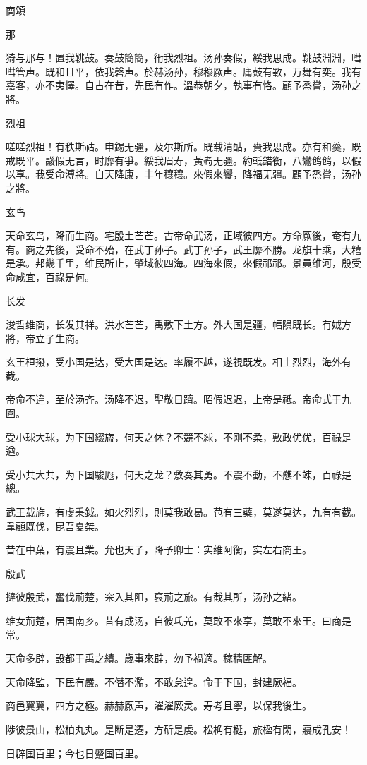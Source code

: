 商頌


那

猗与那与！置我鞉鼓。奏鼓簡簡，衎我烈祖。汤孙奏假，綏我思成。鞉鼓淵淵，嘒嘒管声。既和且平，依我磬声。於赫汤孙，穆穆厥声。庸鼓有斁，万舞有奕。我有嘉客，亦不夷懌。自古在昔，先民有作。溫恭朝夕，執事有恪。顧予烝嘗，汤孙之將。

烈祖

嗟嗟烈祖！有秩斯祜。申錫无疆，及尔斯所。既载清酤，賚我思成。亦有和羹，既戒既平。鬷假无言，时靡有爭。綏我眉寿，黃耇无疆。約軧錯衡，八鸞鸧鸧，以假以享。我受命溥將。自天降康，丰年穰穰。來假來饗，降福无疆。顧予烝嘗，汤孙之將。

玄鸟

天命玄鸟，降而生商。宅殷土芒芒。古帝命武汤，正域彼四方。方命厥後，奄有九有。商之先後，受命不殆，在武丁孙子。武丁孙子，武王靡不勝。龙旗十乘，大糦是承。邦畿千里，维民所止，肇域彼四海。四海來假，來假祁祁。景員维河，殷受命咸宜，百祿是何。

长发

浚哲维商，长发其祥。洪水芒芒，禹敷下土方。外大国是疆，幅隕既长。有娀方將，帝立子生商。

玄王桓撥，受小国是达，受大国是达。率履不越，遂視既发。相土烈烈，海外有截。

帝命不違，至於汤齐。汤降不迟，聖敬日躋。昭假迟迟，上帝是祗。帝命式于九圍。

受小球大球，为下国綴旒，何天之休？不競不絿，不刚不柔，敷政优优，百祿是遒。

受小共大共，为下国駿厖，何天之龙？敷奏其勇。不震不動，不戁不竦，百祿是總。

武王载旆，有虔秉鉞。如火烈烈，則莫我敢曷。苞有三蘗，莫遂莫达，九有有截。韋顧既伐，昆吾夏桀。

昔在中葉，有震且業。允也天子，降予卿士：实维阿衡，实左右商王。

殷武

撻彼殷武，奮伐荊楚，穼入其阻，裒荊之旅。有截其所，汤孙之緒。

维女荊楚，居国南乡。昔有成汤，自彼氐羌，莫敢不來享，莫敢不來王。曰商是常。

天命多辟，設都于禹之績。歲事來辟，勿予禍適。稼穡匪解。

天命降監，下民有嚴。不僭不濫，不敢怠遑。命于下国，封建厥福。

商邑翼翼，四方之極。赫赫厥声，濯濯厥灵。寿考且寧，以保我後生。

陟彼景山，松柏丸丸。是断是遷，方斫是虔。松桷有梴，旅楹有閑，寢成孔安！

日辟国百里；今也日蹙国百里。

